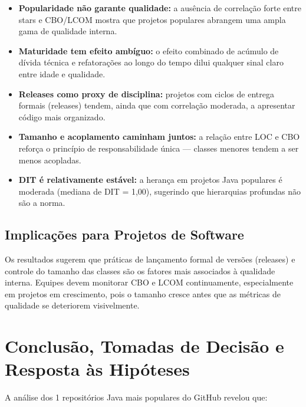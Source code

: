 \documentclass[10pt,a4paper,twocolumn]{article}
\begin{document}
\begin{itemize}
  \item \textbf{Popularidade não garante qualidade:} a ausência de correlação
    forte entre stars e CBO/LCOM mostra que projetos populares abrangem uma
    ampla gama de qualidade interna.

  \item \textbf{Maturidade tem efeito ambíguo:} o efeito combinado de acúmulo
    de dívida técnica e refatorações ao longo do tempo dilui qualquer sinal
    claro entre idade e qualidade.

  \item \textbf{Releases como proxy de disciplina:} projetos com ciclos de
    entrega formais (releases) tendem, ainda que com correlação moderada, a
    apresentar código mais organizado.

  \item \textbf{Tamanho e acoplamento caminham juntos:} a relação entre LOC e
    CBO reforça o princípio de responsabilidade única — classes menores tendem
    a ser menos acopladas.

  \item \textbf{DIT é relativamente estável:} a herança em projetos Java
    populares é moderada (mediana de DIT = 1,00), sugerindo que
    hierarquias profundas não são a norma.
\end{itemize}

\subsection{Implicações para Projetos de Software}

Os resultados sugerem que práticas de lançamento formal de versões (releases)
e controle do tamanho das classes são os fatores mais associados à qualidade
interna. Equipes devem monitorar CBO e LCOM continuamente, especialmente em
projetos em crescimento, pois o tamanho cresce antes que as métricas de
qualidade se deteriorem visivelmente.

\clearpage
\onecolumn

\section{Conclusão, Tomadas de Decisão e Resposta às Hipóteses}

A análise dos 1 repositórios Java mais populares do GitHub revelou que:
\end{document}
